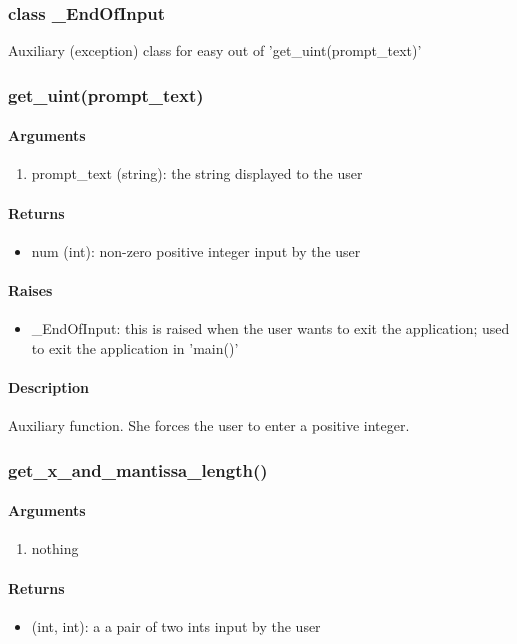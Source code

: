 \subsubsection{class \_EndOfInput}
Auxiliary (exception) class for easy out of 'get\_uint(prompt\_text)'
\subsubsection{get\_uint(prompt\_text)}
\paragraph*{Arguments}
\begin{enumerate}
    \item prompt\_text (string): the string displayed to the user
\end{enumerate}
\paragraph*{Returns}
\begin{itemize}
    \item num (int): non-zero positive integer input by the user
\end{itemize}
\paragraph*{Raises}
\begin{itemize}
    \item \_EndOfInput: this is raised when the user wants to exit the application; used to exit the application in 'main()'
\end{itemize}
\paragraph*{Description}
Auxiliary function. She forces the user to enter a positive integer.
\subsubsection{get\_x\_and\_mantissa\_length()}
\paragraph*{Arguments}
\begin{enumerate}
    \item nothing
\end{enumerate}
\paragraph*{Returns}
\begin{itemize}
    \item (int, int): a a pair of two ints input by the user
\end{itemize}
